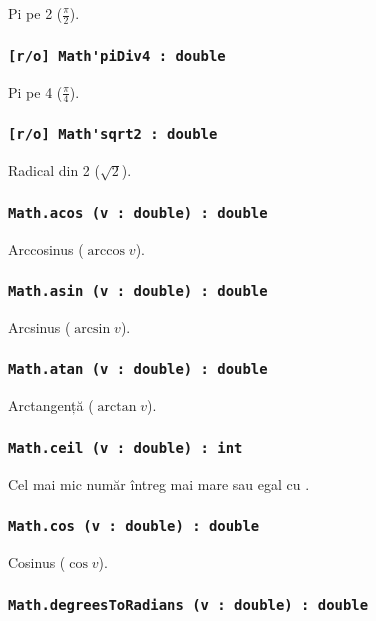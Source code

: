 Pi pe 2 ($\frac{\pi}{2}$).

\subsubsection{\lstinline|[r/o] Math'piDiv4 : double|}

Pi pe 4 ($\frac{\pi}{4}$).

\subsubsection{\lstinline|[r/o] Math'sqrt2 : double|}

Radical din 2 ($\sqrt{2}$).

\subsubsection{\lstinline|Math.acos (v : double) : double|}

Arccosinus ($\arccos{v}$).

\subsubsection{\lstinline|Math.asin (v : double) : double|}

Arcsinus ($\arcsin{v}$).

\subsubsection{\lstinline|Math.atan (v : double) : double|}

Arctangență ($\arctan{v}$).

\subsubsection{\lstinline|Math.ceil (v : double) : int|}

Cel mai mic număr întreg mai mare sau egal cu .

\subsubsection{\lstinline|Math.cos (v : double) : double|}

Cosinus ($\cos{v}$).

\subsubsection{\lstinline|Math.degreesToRadians (v : double) : double|}

